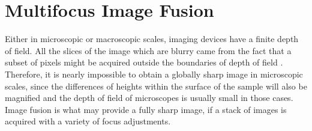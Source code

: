 






\section{Multifocus Image Fusion}
\label{sec:multifocus_image_fusion}

Either in microscopic or macroscopic scales, imaging devices have a finite depth of field. All the slices of the image which are blurry came from the fact that a subset of pixels might be acquired outside the boundaries of depth of field \cite{huang2007evaluation}. Therefore, it is nearly impossible to obtain a globally sharp image in microscopic scales, since the differences of heights within the surface of the sample will also be magnified and the depth of field of microscopes is usually small in those cases. Image fusion is what may provide a fully sharp image, if a stack of images is acquired with a variety of focus adjustments.


